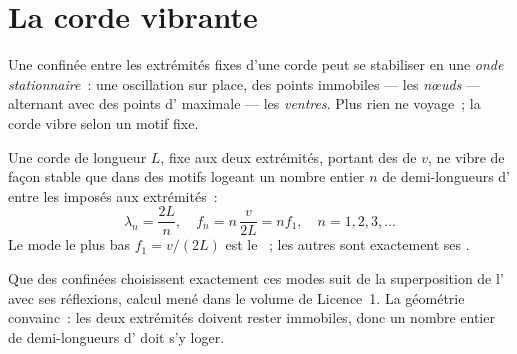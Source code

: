 \section{La corde vibrante}

\begin{definition}\label{def:g12:sound-acoustics:standing-wave}
Une  confinée entre les extrémités fixes d'une corde peut se
stabiliser en une \emph{onde stationnaire}~:
une oscillation sur place, des points immobiles --- les
\emph{nœuds} --- alternant avec des points d'
maximale --- les \emph{ventres}. Plus rien ne voyage~;
la corde vibre selon un motif fixe.
\end{definition}

\begin{proposition}\label{prop:g12:sound-acoustics:string-modes}
Une corde de longueur $L$, fixe aux deux extrémités, portant des
 de  $v$, ne vibre de façon stable que dans des
motifs logeant un nombre entier $n$ de demi-longueurs d'
entre les  imposés aux extrémités~:
\[ \lambda_n = \frac{2L}{n}, \quad f_n = n\,\frac{v}{2L} = n f_1, \quad n = 1, 2, 3, \dots \]
Le mode le plus bas $f_1 = v/(2L)$ est le ~; les
autres sont exactement ses . \admitted
\end{proposition}

\begin{remark}\label{rem:g12:sound-acoustics:honest}
Que des  confinées choisissent exactement ces modes suit de
la superposition de l' avec ses réflexions, calcul mené dans
le volume de Licence~1. La géométrie convainc~: les deux extrémités
doivent rester immobiles, donc un nombre entier de
demi-longueurs d' doit s'y loger.
\end{remark}

